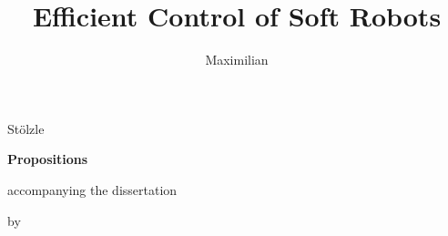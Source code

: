 \documentclass{propositions}
\begin{document}
\title[Synergizing Physics and Learned Models for Ensuring Precision and Safety]{Efficient Control of Soft Robots}

\author{Maximilian}{Stölzle}

\begin{center}

{\Large\titlefont\bfseries Propositions}

\medskip

accompanying the dissertation

\medskip

{\makeatletter
\titlestyle\bfseries\large\@title
\makeatother}

{\makeatletter
\ifx\@subtitle\undefined\else
    \titlefont\titleshape\@subtitle
\fi
\makeatother}

\medskip

by

\medskip

\makeatletter
{\large\titlefont\bfseries\@firstname\ {\titleshape\@lastname}}
\makeatother

\end{center}

\bigskip
\end{document}
